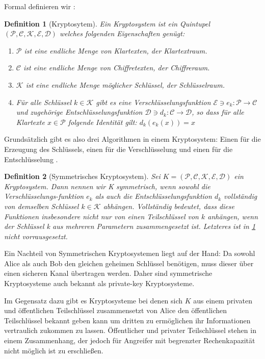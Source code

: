 Formal definieren wir \cite[p.1]{stinson2006cryptography}:

\newtheorem{theorem}{Definition}[section]
\begin{theorem}[Kryptosytem]
	\label{KS}
	Ein Kryptosystem ist ein Quintupel $(\mathcal{P},\mathcal{C},\mathcal{K},\mathcal{E},\mathcal{D})$ welches folgenden Eigenschaften genügt:
	\begin{enumerate}
		\item $\mathcal{P}$ ist eine endliche Menge von Klartexten, der Klartextraum.
		\item $\mathcal{C}$ ist eine endliche Menge von Chiffretexten, der Chiffreraum.
		\item $\mathcal{K}$ ist eine endliche Menge möglicher Schlüssel, der Schlüsselraum.
		\item Für alle Schlüssel $k\in \mathcal{K}$ gibt es eine Verschlüsselungsfunktion $\mathcal{E}\ni e_k:\mathcal{P}\rightarrow\mathcal{C}$ und zugehörige Entschlüsselungsfunktion $\mathcal{D}\ni d_k:\mathcal{C}\rightarrow\mathcal{D}$, so dass für alle Klartexte $x\in\mathcal{P}$ folgende Identität gilt: $d_k(e_k(x)) = x$
	\end{enumerate}
\end{theorem}

Grundsätzlich gibt es also drei Algorithmen in einem Kryptosystem: Einen für die Erzeugung des Schlüssels, einen für die Verschlüsselung und einen für die Entschlüsselung \cite{Cryptosy29:online}.

\begin{theorem}[Symmetrisches Kryptosystem]
	Sei $K = (\mathcal{P},\mathcal{C},\mathcal{K},\mathcal{E},\mathcal{D})$ ein Kryptosystem. Dann nennen wir K symmetrisch, wenn sowohl die Verschlüsselungs-funktion $e_k$ als auch die Entschlüsselungsfunktion $d_k$ vollständig von \textit{demselben} Schlüssel $k\in\mathcal{K}$ abhängen. Vollständig bedeutet, dass diese Funktionen insbesondere nicht nur von einen Teilschlüssel von $k$ anhängen, wenn der Schlüssel k aus mehreren Parametern zusammengesetzt ist. Letzteres ist in \ref{KS} nicht vorrausgesetzt.
\end{theorem}

Ein Nachteil von Symmetrischen Kryptosystemen liegt auf der Hand: Da sowohl Alice als auch Bob den gleichen geheimen Schlüssel benötigen, muss dieser über einen sicheren Kanal übertragen werden. Daher sind  symmetrische Kryptosysteme auch bekannt als private-key Kryptosysteme.

Im Gegensatz dazu gibt es Kryptosysteme bei denen sich $K$ aus einem privaten und öffentlichen Teilschlüssel zusammensetzt von Alice den öffentlichen Teilschlüssel bekannt geben kann um dritten zu ermöglichen ihr Informationen vertraulich zukommen zu lassen. Öffentlicher und privater Teilschlüssel stehen in einem Zusammenhang, der jedoch für Angreifer mit begrenzter Rechenkapazität nicht möglich ist zu erschließen.

